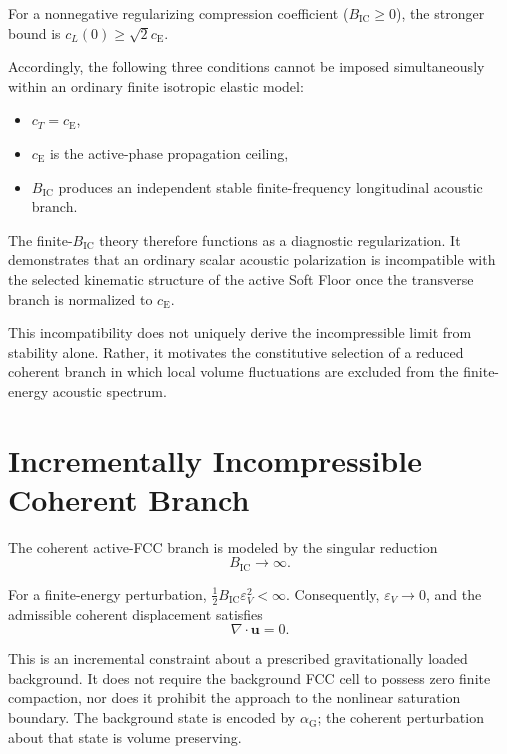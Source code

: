 For a nonnegative regularizing compression coefficient ($B_{\mathrm{IC}}\geq0$), the stronger bound is $c_L(0)\geq\sqrt{2}c_{\mathrm{E}}$.

Accordingly, the following three conditions cannot be imposed simultaneously within an ordinary finite isotropic elastic model:
\begin{itemize}
    \item $c_T=c_{\mathrm{E}}$,
    \item $c_{\mathrm{E}}$ is the active-phase propagation ceiling,
    \item $B_{\mathrm{IC}}$ produces an independent stable finite-frequency longitudinal acoustic branch.
\end{itemize}

The finite-$B_{\mathrm{IC}}$ theory therefore functions as a diagnostic regularization. It demonstrates that an ordinary scalar acoustic polarization is incompatible with the selected kinematic structure of the active Soft Floor once the transverse branch is normalized to $c_{\mathrm{E}}$.

This incompatibility does not uniquely derive the incompressible limit from stability alone. Rather, it motivates the constitutive selection of a reduced coherent branch in which local volume fluctuations are excluded from the finite-energy acoustic spectrum.

\section{Incrementally Incompressible Coherent Branch}

The coherent active-FCC branch is modeled by the singular reduction
\begin{equation}
    \boxed{ B_{\mathrm{IC}}\rightarrow\infty }.
\end{equation}

For a finite-energy perturbation, $\frac{1}{2} B_{\mathrm{IC}} \varepsilon_V^2 < \infty$. Consequently, $\varepsilon_V\rightarrow0$, and the admissible coherent displacement satisfies
\begin{equation}
    \boxed{ \nabla\cdot\mathbf{u}=0 }.
\end{equation}

This is an incremental constraint about a prescribed gravitationally loaded background. It does not require the background FCC cell to possess zero finite compaction, nor does it prohibit the approach to the nonlinear saturation boundary. The background state is encoded by $\alpha_{\mathrm{G}}$; the coherent perturbation about that state is volume preserving.

